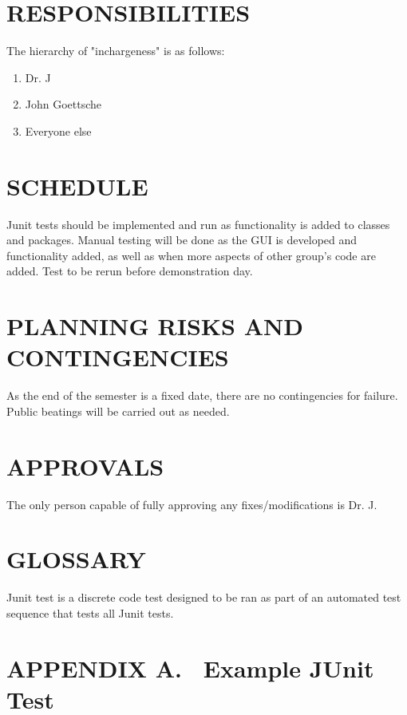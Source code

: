 {\section[RESPONSIBILITIES]{\bfseries\color{black} RESPONSIBILITIES}
{\color{black}
The hierarchy of "inchargeness" is as follows:
\begin{enumerate}
\item Dr. J
\item John Goettsche
\item Everyone else
\end{enumerate}
}
\section[SCHEDULE]{\bfseries\color{black} SCHEDULE}
{\color{black}
Junit tests should be implemented and run as functionality is added to classes and packages. Manual testing will be done as the GUI is developed and functionality added, as well as when more aspects of other group's code are added. Test to be rerun before demonstration day.
}

\section[PLANNING RISKS AND CONTINGENCIES]{\bfseries\color{black}
	 PLANNING RISKS AND CONTINGENCIES}
{\color{black}
As the end of the semester is a fixed date, there are no contingencies for failure. Public beatings will be carried out as needed.}

\section[APPROVALS]{\bfseries\color{black} APPROVALS}
{\color{black}
The only person capable of fully approving any fixes/modifications is Dr. J.}

\section[GLOSSARY]{\bfseries\color{black} GLOSSARY}
{\color{black}
Junit test is a discrete code test designed to be ran as part of an automated test sequence that tests all Junit tests.}


\clearpage\setcounter{page}{1}\pagestyle{Convertviii}
\section[APPENDIX A. \ [Example JUnit Test{]}]{\bfseries\color{black} APPENDIX A.
\ Example JUnit Test}


}

